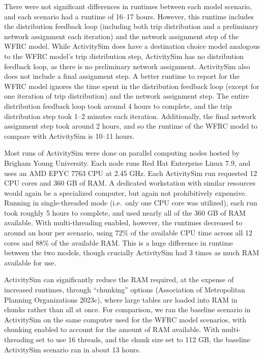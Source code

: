 \documentclass[fancy, twoside, mastersfancy, ms]{byuthesis}
\begin{document}
There were not significant differences in runtimes between each model
scenario, and each scenario had a runtime of 16--17 hours. However, this
runtime includes the distribution feedback loop (including both trip
distribution and a preliminary network assignment each iteration) and
the network assignment step of the WFRC model. While ActivitySim does
have a destination choice model analogous to the WFRC model's trip
distribution step, ActivitySim has no distribution feedback loop, as
there is no preliminary network assignment. ActivitySim also does not
include a final assignment step. A better runtime to report for the WFRC
model ignores the time spent in the distribution feedback loop (except
for one iteration of trip distribution) and the network assignment step.
The entire distribution feedback loop took around 4 hours to complete,
and the trip distribution step took 1--2 minutes each iteration.
Additionally, the final network assignment step took around 2 hours, and
so the runtime of the WFRC model to compare with ActivitySim is 10--11
hours.

Most runs of ActivitySim were done on parallel computing nodes hosted by
Brigham Young University. Each node runs Red Hat Enterprise Linux 7.9,
and uses an AMD EPYC 7763 CPU at 2.45 GHz. Each ActivitySim run
requested 12 CPU cores and 360 GB of RAM. A dedicated workstation with
similar resources would again be a specialized computer, but again not
prohibitively expensive. Running in single-threaded mode (i.e.~only one
CPU core was utilized), each run took roughly 5 hours to complete, and
used nearly all of the 360 GB of RAM available. With multi-threading
enabled, however, the runtimes decreased to around an hour per scenario,
using 72\% of the available CPU time across all 12 cores and 88\% of the
available RAM. This is a huge difference in runtime between the two
models, though crucially ActivitySim had 3 times as much RAM available
for use.

ActivitySim can significantly reduce the RAM required, at the expense of
increased runtimes, through ``chunking'' options (Association of
Metropolitan Planning Organizations 2023c), where large tables are
loaded into RAM in chunks rather than all at once. For comparison, we
ran the baseline scenario in ActivitySim on the same computer used for
the WFRC model scenarios, with chunking enabled to account for the
amount of RAM available. With multi-threading set to use 16 threads, and
the chunk size set to 112 GB, the baseline ActivitySim scenario ran in
about 13 hours.
\end{document}
